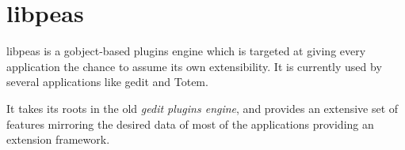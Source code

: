 
\section[libpeas]{libpeas\cite{website:libpeas}}\label{sec:peas}

libpeas is a gobject-based plugins engine which is targeted at giving every application the chance to assume its own extensibility. It is currently used by several \GNOME applications like gedit and Totem.

It takes its roots in the old \emph{gedit plugins engine}, and provides an extensive set of features mirroring the desired data of most of the applications providing an extension framework.
